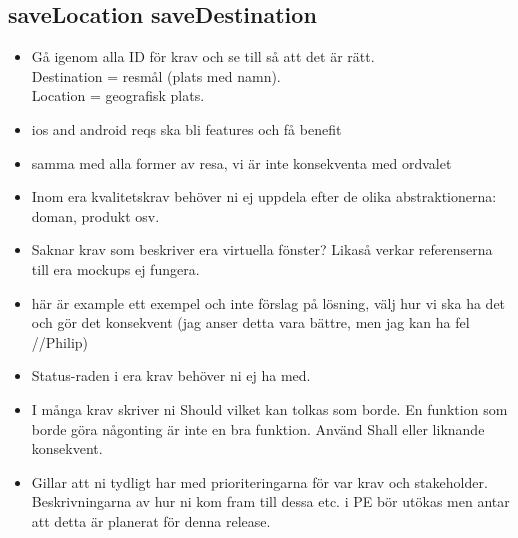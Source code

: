 \documentclass[a4paper]{article}
\begin{document}
\subsection{saveLocation saveDestination}
		\begin{itemize}
			\item Gå igenom alla ID för krav och se till så att det är rätt.
			\\Destination = resmål (plats med namn).
			\\Location = geografisk plats.
		\end{itemize}
	\begin{itemize}	
	\item ios and android reqs ska bli features och få benefit
	\item samma med alla former av resa, vi är inte konsekventa med ordvalet
	\item Inom era kvalitetskrav behöver ni ej uppdela efter de olika abstraktionerna: doman, produkt osv.
	\item Saknar krav som beskriver era virtuella fönster? Likaså verkar referenserna till era mockups ej fungera.
	
	\item här är example ett exempel och inte förslag på lösning, välj hur vi ska ha det och gör det konsekvent (jag anser detta vara bättre, men jag kan ha fel //Philip)
	
	\item Status-raden i era krav behöver ni ej ha med.
	\item I många krav skriver ni Should vilket kan tolkas som borde. En funktion som borde göra någonting är inte en bra funktion. Använd Shall eller liknande konsekvent. 
	\item Gillar att ni tydligt har med prioriteringarna för var krav och stakeholder. Beskrivningarna av hur ni kom fram till dessa etc. i PE bör utökas men antar att detta är planerat för denna release.
	\end{itemize}
\end{document}
